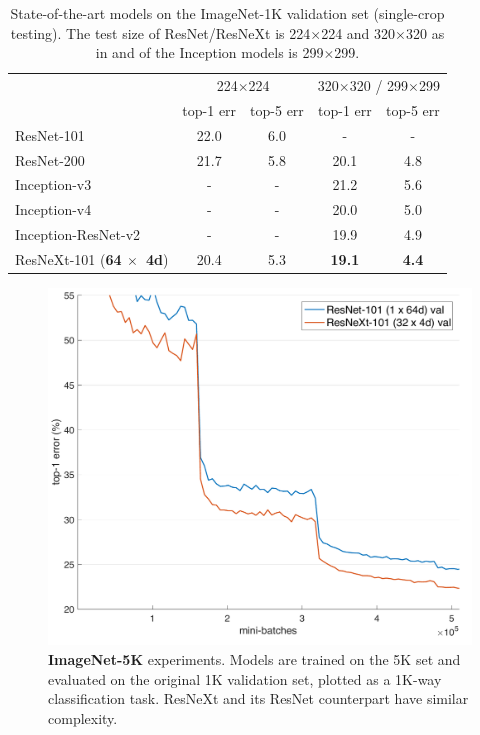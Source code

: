 \documentclass[10pt,twocolumn,letterpaper]{article}
\newcommand{\m}{$\times$}
\begin{document}
\setlength{\tabcolsep}{2pt}
\begin{table}[!htp]
\begin{center}
\small
\begin{tabular}{l|c|c|c|c}
\hline
& \multicolumn{2}{c|}{\footnotesize 224$\times$224}
& \multicolumn{2}{c}{\footnotesize 320$\times$320 / 299$\times$299} \\
\cline{2-5}
	& \footnotesize top-1 err
	& \footnotesize top-5 err
	& \footnotesize top-1 err
	& \footnotesize top-5 err \\
\hline
ResNet-101	\cite{He2016}							& 22.0 			& 6.0		& - 			& - \\
ResNet-200 \cite{He2016a}							& 21.7			& 5.8		& 20.1		& 4.8 \\
\hline
Inception-v3	 \cite{Szegedy2016a}				& -				& -			& 21.2 		& 5.6 \\
Inception-v4	 \cite{Szegedy2016}				& -				& -			& 20.0 		& 5.0 \\
Inception-ResNet-v2 \cite{Szegedy2016}	& -				& -			& 19.9 		& 4.9 \\
\hline
ResNeXt-101 (\textbf{64 \m~4d})				& {20.4}	& {5.3} 	& \textbf{19.1}			& \textbf{4.4} \\
\hline
\end{tabular}
\end{center}
\caption{State-of-the-art models on the ImageNet-1K validation set (single-crop testing).
The test size of ResNet/ResNeXt is 224$\times$224 and 320$\times$320 as in \cite{He2016a} and of the Inception models is 299$\times$299.}
\label{tab:more}
\end{table}

\begin{figure}[t]
\centering
\vspace{-1em}
\includegraphics[width=1.0\linewidth]{eps/resnet101-5k}
\caption{\textbf{ImageNet-5K} experiments. Models are trained on the 5K set and evaluated on the original 1K validation set, plotted as a 1K-way classification task. ResNeXt and its ResNet counterpart have similar complexity.}
\label{fig:imagenet5k}
\end{figure}
\end{document}
